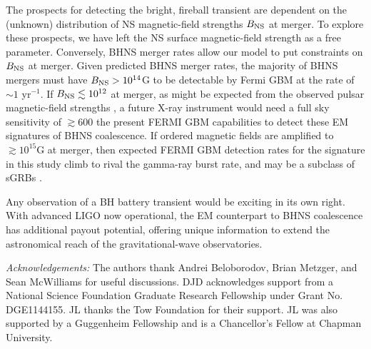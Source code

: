 The prospects for detecting the bright, fireball transient are
dependent on the (unknown) distribution of NS magnetic-field strengths
$B_{\rm{NS}}$ at merger. To explore these prospects, we have left the NS surface 
magnetic-field strength as a free parameter. Conversely, BHNS merger rates allow our model to put constraints on $B_{\rm{NS}}$ at merger. Given predicted BHNS merger rates, the majority of BHNS mergers must have $B_{\rm{NS}} > 10^{14}$G to be
detectable by Fermi GBM at the rate of $\sim 1$ yr$^{-1}$. If
$B_{\rm{NS}}\lesssim 10^{12}$ at merger, as might be expected from the
observed pulsar magnetic-field strengths \citep{PulsarsRev:1991}, a
future X-ray instrument would need a full sky sensitivity of $\gtrsim
600$ the present FERMI GBM capabilities to detect these EM signatures
of BHNS coalescence. If ordered magnetic fields are amplified to
$\gtrsim 10^{15}$G at merger, then expected FERMI GBM detection rates
for the signature in this study climb to rival the gamma-ray burst
rate, and may be a subclass of sGRBs \citep{SWIFTsGRBrates:2012}.
 


Any observation of a BH battery transient would be exciting in its own
right.  With advanced LIGO now operational, the EM counterpart to BHNS
coalescence has additional payout potential, offering unique
information to extend the astronomical reach of the gravitational-wave
observatories.





\textit{Acknowledgements:} The authors thank Andrei Beloborodov, Brian Metzger,
and Sean McWilliams for useful discussions.  DJD acknowledges support
from a National Science Foundation Graduate Research Fellowship under
Grant No. DGE1144155.  JL thanks the Tow Foundation for their
support. JL was also supported by a Guggenheim Fellowship and is a
Chancellor's Fellow at Chapman University.










































